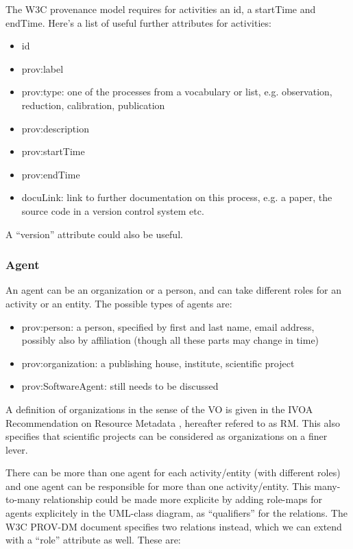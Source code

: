 The W3C provenance model requires for activities an id, a startTime and endTime. 
Here's a list of useful further attributes for activities:

\begin{itemize}
\item id
\item prov:label
\item prov:type: one of the processes from a vocabulary or list, e.g. observation, reduction, calibration, publication
\item prov:description
\item prov:startTime
\item prov:endTime
\item docuLink: link to further documentation on this process, e.g. a paper, the source code in a version control system etc.
\end{itemize}

A ``version'' attribute could also be useful.



\subsubsection{Agent}\label{sec:w3c-agent}
An agent can be an organization or a person, and can take different roles for an activity or an entity. The possible types of agents are:
\begin{itemize}
\item prov:person: a person, specified by first and last name, email address, possibly also by affiliation (though all these parts may change in time)
\item prov:organization: a publishing house, institute, scientific project
\item prov:SoftwareAgent: still needs to be discussed
\end{itemize}

A definition of organizations in the sense of the VO is given in the IVOA Recommendation on Resource Metadata \citep{std:ResourceMeta}, hereafter refered to as RM. This also specifies that scientific projects can be considered as organizations on a finer lever.

There can be more than one agent for each activity/entity (with different roles) and one agent can be responsible for more than one activity/entity. This many-to-many relationship could be made more explicite by adding role-maps for agents explicitely in the UML-class diagram, as ``qualifiers'' for the relations. The W3C PROV-DM document specifies two relations instead, which we can extend with a ``role'' attribute as well. These are:

